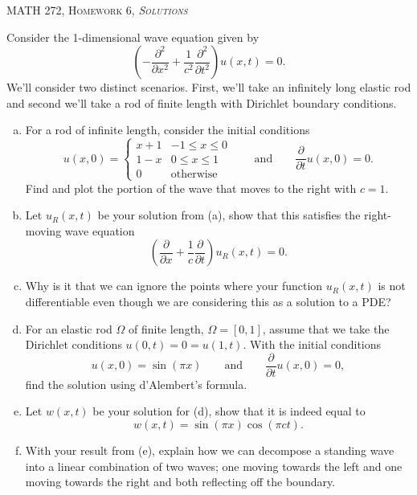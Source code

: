 \documentclass[12pt]{article} %
\begin{document}
\begin{center}
   \textsc{\large MATH 272, Homework 6, \emph{Solutions}}\\
\end{center}
\vspace{.5cm}

\begin{problem}
Consider the 1-dimensional wave equation given by
\[
\left(-\frac{\partial^2}{\partial x^2} +\frac{1}{c^2} \frac{\partial^2}{\partial  t^2} \right) u(x,t) = 0.
\]
We'll consider two distinct scenarios. First, we'll take an infinitely long elastic rod and second we'll take a rod of finite length with Dirichlet boundary conditions.
\begin{enumerate}[(a)]
    \item For a rod of infinite length, consider the initial conditions
    \[
    u(x,0) = \begin{cases} x+1 & -1\leq x \leq 0 \\ 1-x & 0\leq x \leq 1 \\ 0 & \textrm{otherwise} \end{cases} \qquad \textrm{and} \qquad \frac{\partial}{\partial t} u(x,0) = 0.
    \]
    Find and plot the portion of the wave that moves to the right with $c=1$.
    \item Let $u_R(x,t)$ be your solution from (a), show that this satisfies the right-moving wave equation
    \[
    \left(\frac{\partial}{\partial x} + \frac{1}{c} \frac{\partial}{\partial t} \right)u_R(x,t) = 0.
    \]
    \item Why is it that we can ignore the points where your function $u_R(x,t)$ is not differentiable even though we are considering this as a solution to a PDE?
    \item For an elastic rod $\Omega$ of finite length, $\Omega = [0,1]$, assume that we take the Dirichlet conditions $u(0,t)=0=u(1,t)$.  With the initial conditions
    \[
    u(x,0) = \sin(\pi x) \qquad \textrm{and} \qquad \frac{\partial}{\partial t} u(x,0)=0,
    \]
    find the solution using d'Alembert's formula.
    \item Let $w(x,t)$ be your solution for (d), show that it is indeed equal to
    \[
    w(x,t) = \sin(\pi x)\cos(\pi c t).
    \]
    \item With your result from (e), explain how we can decompose a standing wave into a linear combination of two waves; one moving towards the left and one moving towards the right and both reflecting off the boundary.
\end{enumerate}
\end{problem}
\end{document}
